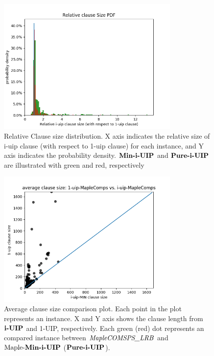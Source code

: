 \begin{figure}
    \centering
    \includegraphics[width=0.8\textwidth,natwidth=610,natheight=642]{figures/factor_clause_length_PDF.png}
    \caption{ Relative Clause size distribution. X axis indicates the relative size of i-uip clause (with respect to 1-uip clause) for each instance, and Y axis indicates the probability density. $\textbf{Min-i-UIP}$ and $\textbf{Pure-i-UIP}$ are illustrated with green and red, respectively}
     \label{fig:len_pdf}
\end{figure}
\begin{figure} \label{fig:len_compare}
    \centering
    \includegraphics[width=0.8\textwidth,natwidth=610,natheight=642]{i-uip-sizes-compare.png}
    \caption{Average clause size comparison plot. Each point in the plot represents an instance. X and Y axis shows the clause length from $\textbf{i-UIP}$ and 1-UIP, respectively. Each green (red) dot represents an compared instance between $\textit{MapleCOMSPS\_LRB}$ and $\text{Maple-\textbf{Min-i-UIP}}$ ($\textbf{Pure-i-UIP}$). }
    \label{fig:len_compare}
\end{figure}


